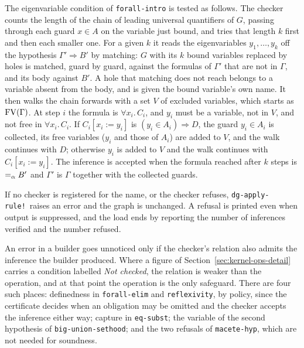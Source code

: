 The eigenvariable condition of \texttt{forall-intro} is tested as
follows.  The checker counts the length of
the chain of leading universal quantifiers of $G$, passing through each
guard $x \in A$ on the variable just bound, and tries that length $k$
first and then each smaller one.  For a given $k$ it reads the
eigenvariables $y_1, \ldots, y_k$ off the hypothesis
$\Gamma' \Longrightarrow B'$ by matching: $G$ with its $k$ bound
variables replaced by holes is matched, guard by guard, against the
formulas of $\Gamma'$ that are not in $\Gamma$, and its body against
$B'$.  A hole that matching does not reach belongs to a variable absent
from the body, and is given the bound variable's own name.  It then
walks the chain forwards with a set $V$ of excluded variables, which
starts as $\mathrm{FV}(\Gamma)$.  At step $i$ the formula is
$\forall x_i.\, C_i$, and $y_i$ must be a variable, not in $V$, and not
free in $\forall x_i.\, C_i$.  If $C_i[x_i{:=}y_i]$ is
$(y_i \in A_i) \Rightarrow D$, the guard $y_i \in A_i$ is collected, its
free variables ($y_i$ and those of $A_i$) are added to $V$, and the walk
continues with $D$; otherwise $y_i$ is added to $V$ and the walk
continues with $C_i[x_i{:=}y_i]$.  The inference is accepted when the
formula reached after $k$ steps is $=_{\alpha} B'$ and $\Gamma'$ is $\Gamma$
together with the collected guards.

If no checker is registered for the name, or the checker refuses,
\texttt{dg-apply-rule!}\ raises an error and the graph is unchanged.  A
refusal is printed even when output is suppressed, and the load ends by
reporting the number of inferences verified and the number refused.

An error in a builder goes unnoticed only if the checker's relation also
admits the inference the builder produced.  Where a figure of
Section~\ref{sec:kernel-ops-detail} carries a condition labelled
\emph{Not checked}, the relation is weaker than the operation, and at
that point the operation is the only safeguard.  There are four such
places: definedness in \texttt{forall-elim} and \texttt{reflexivity}, by
policy, since the certificate decides when an obligation may be omitted
and the checker accepts the inference either way; capture in
\texttt{eq-subst}; the variable of the second hypothesis of
\texttt{big-union-sethood}; and the two refusals of
\texttt{macete-hyp}, which are not needed for soundness.

